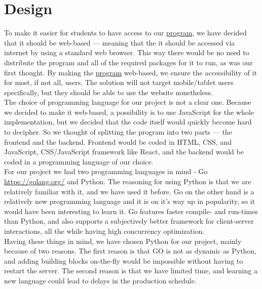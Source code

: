 \documentclass[11pt]{article}
\begin{document}
\section{Design}
To make it easier for students to have access to our \underline{program}, we have decided that it should be web-based --- meaning that the it should be accessed via internet by using a standard web browser. This way there would be no need to distribute the program and all of the required packages for it to run, as was our first thought. By making the \underline{program} web-based, we ensure the accessibility of it for most, if not all, users. The solution will not target mobile/tablet users specifically, but they should be able to use the website nonetheless.\\
The choice of programming language for our project is not a clear one. Because we decided to make it web-based, a possibility is to use JavaScript for the whole implementation, but we decided that the code itself would quickly become hard to decipher. So we thought of splitting the program into two parts --- the frontend and the backend. Frontend would be coded in HTML, CSS, and JavaScript, CSS/JavaScript framework like React, and the backend would be coded in a programming language of our choice.\\

For our project we had two programming languages in mind - Go \url{https://golang.org/} and Python. The reasoning for using Python is that we are relatively familiar with it, and we have used it before. Go on the other hand is a relatively new programming language and it is on it's way up in popularity, so it would have been interesting to learn it. Go features faster compile- and run-times than Python, and also supports a subjectively better framework for client-server interactions, all the while having high concurrency optimization.\\
Having these things in mind, we have chosen Python for our project, mainly because of two reasons. The first reason is that GO is not as dynamic as Python, and adding building blocks on-the-fly would be impossible without having to restart the server. The second reason is that we have limited time, and learning a new language could lead to delays in the production schedule.\\
\end{document}
